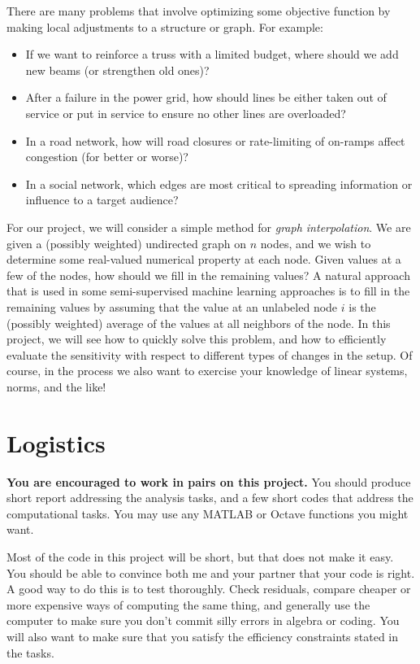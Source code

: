 \documentclass[12pt, leqno]{article}
\begin{document}

There are many problems that involve optimizing some objective
function by making local adjustments to a structure or graph.
For example:
\begin{itemize}
\item If we want to reinforce a truss with a limited budget, where
  should we add new beams (or strengthen old ones)?
\item After a failure in the power grid, how should lines be either
  taken out of service or put in service to ensure no other lines
  are overloaded?
\item In a road network, how will road closures or rate-limiting of
  on-ramps affect congestion (for better or worse)?
\item In a social network, which edges are most critical to
  spreading information or influence to a target audience?
\end{itemize}

For our project, we will consider a simple method for {\em graph
interpolation}.  We are given a (possibly weighted) undirected graph on
$n$ nodes, and we wish to determine some real-valued numerical property
at each node.  Given values at a few of the nodes, how should we fill in
the remaining values?  A natural approach that is used in some
semi-supervised machine learning approaches is to fill in the remaining
values by assuming that the value at an unlabeled node $i$ is the
(possibly weighted) average of the values at all neighbors of the node.
In this project, we will see how to quickly solve this problem, and how
to efficiently evaluate the sensitivity with respect to different types
of changes in the setup.  Of course, in the process we also want to
exercise your knowledge of linear systems, norms, and the like!

\section*{Logistics}

{\bf You are encouraged to work in pairs on this project.}  You should
produce short report addressing the analysis tasks, and a few
short codes that address the computational tasks.  You may
use any MATLAB or Octave functions you might want.

Most of the code in this project will be short, but that does not make
it easy.  You should be able to convince both me and your partner that
your code is right.  A good way to do this is to test thoroughly.
Check residuals, compare cheaper or more expensive ways of computing
the same thing, and generally use the computer to make sure you don't
commit silly errors in algebra or coding.  You will also want to make
sure that you satisfy the efficiency constraints stated in the tasks.
\end{document}

